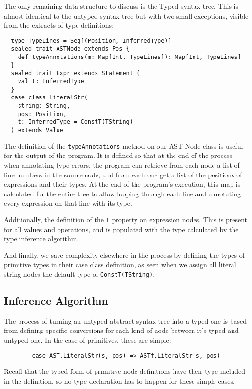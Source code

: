 \documentclass[british, twoside, openright]{bhamthesis}
\theoremstyle{definition}
\begin{document}
      The only remaining data structure to discuss is the Typed syntax tree. This is almost identical to the untyped syntax tree but with two small exceptions, visible from the extracts of type definitions:
      \begin{lstlisting}
  type TypeLines = Seq[(Position, InferredType)]
  sealed trait ASTNode extends Pos {
    def typeAnnotations(m: Map[Int, TypeLines]): Map[Int, TypeLines]
  }
  sealed trait Expr extends Statement {
    val t: InferredType
  }
  case class LiteralStr(
    string: String,
    pos: Position,
    t: InferredType = ConstT(TString)
  ) extends Value
      \end{lstlisting}

      The definition of the \texttt{typeAnnotations} method on our AST Node class is useful for the output of the program. It is defined so that at the end of the process, when annotating type errors, the program can retrieve from each node a list of line numbers in the source code, and from each one get a list of the positions of expressions and their types. At the end of the program's execution, this map is calculated for the entire tree to allow looping through each line and annotating every expression on that line with its type.

      Additionally, the definition of the \texttt{t} property on expression nodes. This is present for all values and operations, and is populated with the type calculated by the type inference algorithm.

      And finally, we save complexity elsewhere in the process by defining the types of primitive types in their case class definition, as seen when we assign all literal string nodes the default type of \texttt{ConstT(TString)}.

      \subsection{Inference Algorithm}

      The process of turning an untyped abstract syntax tree into a typed one is based from defining specific conversions for each kind of node between it's typed and untyped one. In the case of primitives, these are simple:

      \begin{lstlisting}
        case AST.LiteralStr(s, pos) => ASTf.LiteralStr(s, pos)
      \end{lstlisting}

      Recall that the typed form of primitive node definitions have their type included in the definition, so no type declaration has to happen for these simple cases.
\end{document}
